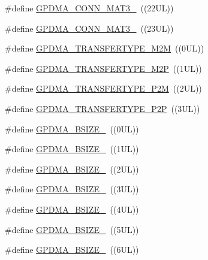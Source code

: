 \begin{DoxyCompactItemize}
\#define \hyperlink{group___g_p_d_m_a___public___macros_ga15edb7c54b8ea2d2c8b0c2f762cc0ba6}{\-G\-P\-D\-M\-A\-\_\-\-C\-O\-N\-N\-\_\-\-M\-A\-T3\-\_}~((22\-U\-L))
\item 
\#define \hyperlink{group___g_p_d_m_a___public___macros_ga222eda98e258b4b4f8ff61d5aa777276}{\-G\-P\-D\-M\-A\-\_\-\-C\-O\-N\-N\-\_\-\-M\-A\-T3\-\_}~((23\-U\-L))
\item 
\#define \hyperlink{group___g_p_d_m_a___public___macros_gabbb6eb10ec3af5e1ad2f9eb92e06b006}{\-G\-P\-D\-M\-A\-\_\-\-T\-R\-A\-N\-S\-F\-E\-R\-T\-Y\-P\-E\-\_\-\-M2\-M}~((0\-U\-L))
\item 
\#define \hyperlink{group___g_p_d_m_a___public___macros_ga99630d19b793cf2019b0da90714bc33d}{\-G\-P\-D\-M\-A\-\_\-\-T\-R\-A\-N\-S\-F\-E\-R\-T\-Y\-P\-E\-\_\-\-M2\-P}~((1\-U\-L))
\item 
\#define \hyperlink{group___g_p_d_m_a___public___macros_gaec972978251f2b099789246300a69f9d}{\-G\-P\-D\-M\-A\-\_\-\-T\-R\-A\-N\-S\-F\-E\-R\-T\-Y\-P\-E\-\_\-\-P2\-M}~((2\-U\-L))
\item 
\#define \hyperlink{group___g_p_d_m_a___public___macros_ga9888275bfb63f996ad9af32a5784393a}{\-G\-P\-D\-M\-A\-\_\-\-T\-R\-A\-N\-S\-F\-E\-R\-T\-Y\-P\-E\-\_\-\-P2\-P}~((3\-U\-L))
\item 
\#define \hyperlink{group___g_p_d_m_a___public___macros_gafd44c148b998d28bc156b947794ad011}{\-G\-P\-D\-M\-A\-\_\-\-B\-S\-I\-Z\-E\-\_}~((0\-U\-L))
\item 
\#define \hyperlink{group___g_p_d_m_a___public___macros_ga768f1f0d1cf1a2611573362ed7b6a18d}{\-G\-P\-D\-M\-A\-\_\-\-B\-S\-I\-Z\-E\-\_}~((1\-U\-L))
\item 
\#define \hyperlink{group___g_p_d_m_a___public___macros_ga21239562985215b67c024871f804f0bd}{\-G\-P\-D\-M\-A\-\_\-\-B\-S\-I\-Z\-E\-\_}~((2\-U\-L))
\item 
\#define \hyperlink{group___g_p_d_m_a___public___macros_ga6a56379136d5416a0799642fa2217fe2}{\-G\-P\-D\-M\-A\-\_\-\-B\-S\-I\-Z\-E\-\_}~((3\-U\-L))
\item 
\#define \hyperlink{group___g_p_d_m_a___public___macros_ga2ebaf7a771f5bf603ecfed0503a66c5c}{\-G\-P\-D\-M\-A\-\_\-\-B\-S\-I\-Z\-E\-\_}~((4\-U\-L))
\item 
\#define \hyperlink{group___g_p_d_m_a___public___macros_gababd7d98382dd69ae09a9a4b447a0977}{\-G\-P\-D\-M\-A\-\_\-\-B\-S\-I\-Z\-E\-\_}~((5\-U\-L))
\item 
\#define \hyperlink{group___g_p_d_m_a___public___macros_ga808a32404cd29d656eb9ee31dacacdbb}{\-G\-P\-D\-M\-A\-\_\-\-B\-S\-I\-Z\-E\-\_}~((6\-U\-L))

\end{DoxyCompactItemize}
